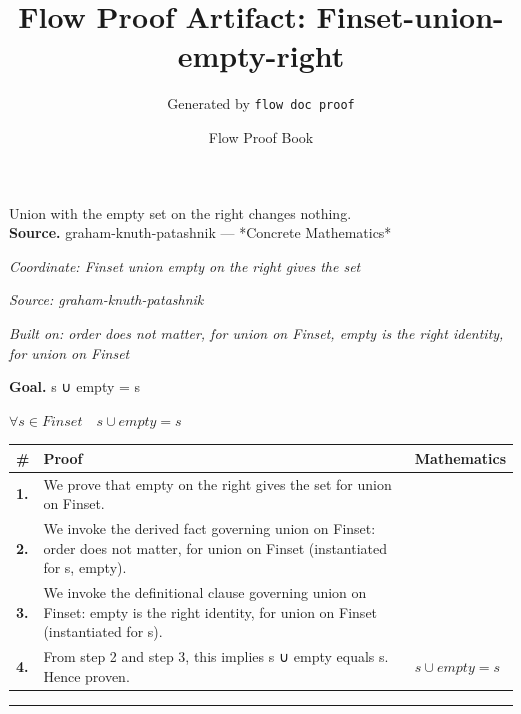 \documentclass[11pt]{article}
\title{Flow Proof Artifact: Finset-union-empty-right}
\author{Generated by \texttt{flow doc proof}}
\date{Flow Proof Book}
\theoremstyle{definition}
\begin{document}
\maketitle
Union with the empty set on the right changes nothing.\\[0.5em]
\textbf{Source.} graham-knuth-patashnik — *Concrete Mathematics*\\[0.5em]
\bigskip
{}\par
\smallskip\noindent\textit{Coordinate: Finset \cdot union \cdot empty on the right gives the set}\par
\smallskip\noindent\textit{Source: graham-knuth-patashnik}\par
\smallskip\noindent\textit{Built on: order does not matter, for union on Finset, empty is the right identity, for union on Finset}\par
\medskip
\noindent\textbf{Goal.} s ∪ empty = s\par
\noindent$\displaystyle \forall s \in Finset\quad s ∪ empty = s$\par
\medskip
\noindent
\begin{tabular}{@{} >{\raggedright\arraybackslash}p{} >{\raggedright\arraybackslash}p{} >{\raggedleft\arraybackslash}p{} @{}}
\textbf{\#} & \textbf{Proof} & \textbf{Mathematics} \\
\midrule
\textbf{1.} & We prove that empty on the right gives the set for union on Finset. & \\[0.45em]
\textbf{2.} & We invoke the derived fact governing union on Finset: order does not matter, for union on Finset (instantiated for s, empty). & \\[0.45em]
\textbf{3.} & We invoke the definitional clause governing union on Finset: empty is the right identity, for union on Finset (instantiated for s). & \\[0.45em]
\textbf{4.} & From step 2 and step 3, this implies s ∪ empty equals s. Hence proven. & $\displaystyle s ∪ empty = s$ \\[0.45em]
\bottomrule
\end{tabular}
\label{thm:Finset-union-empty_on_the_right_gives_the_set}
\par\medskip\hrule
\end{document}

